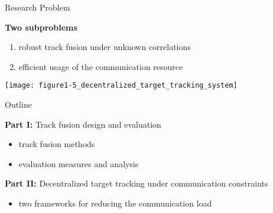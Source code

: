 \documentclass[aspectratio=1610]{beamer}
\begin{document}
\begin{frame}{Research Problem}

\textbf{Two subproblems}
\begin{enumerate}
    \item robust \alert{track fusion} under unknown correlations
    \item efficient usage of the  \alert{communication resource}
\end{enumerate}

\vspace{1em}

\begin{center}
    \texttt{[image: figure1-5\_decentralized\_target\_tracking\_system]}
\end{center}

\end{frame}


\begin{frame}{Outline}

%
%
%
%

\textbf{Part I:} Track fusion design and evaluation
\begin{itemize}
    \item track fusion methods
    \item evaluation measures and analysis
\end{itemize}

\textbf{Part II:} Decentralized target tracking under communication constraints
\begin{itemize}
    \item two frameworks for reducing the communication load
\end{itemize}


\end{frame}
\end{document}
